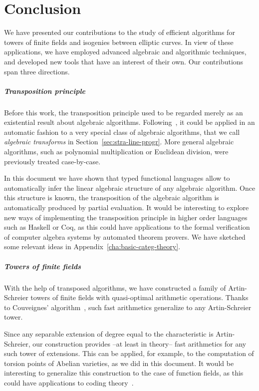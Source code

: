 \chapter{Conclusion}

We have presented our contributions to the study of efficient
algorithms for towers of finite fields and isogenies between elliptic
curves. In view of these applications, we have employed advanced
algebraic and algorithmic techniques, and developed new tools that
have an interest of their own. Our contributions span three directions.

\paragraph{Transposition principle}
Before this work, the transposition principle used to be regarded
merely as an existential result about algebraic algorithms.
Following~\cite{bostan+lecerf+schost:tellegen}, it could be applied in
an automatic fashion to a very special class of algebraic algorithms,
that we call \emph{algebraic transforms} in
Section~\ref{sec:stra-line-progr}. More general algebraic algorithms,
such as polynomial multiplication or Euclidean division, were
previously treated case-by-case.

In this document we have shown that typed functional languages allow
to automatically infer the linear algebraic structure of any algebraic
algorithm. Once this structure is known, the transposition of the
algebraic algorithm is automatically produced by partial evaluation.
It would be interesting to explore new ways of implementing the
transposition principle in higher order languages such as Haskell or
Coq, as this could have applications to the formal verification of
computer algebra systems by automated theorem provers.  We have
sketched some relevant ideas in Appendix~\ref{cha:basic-categ-theory}.

\paragraph{Towers of finite fields}
With the help of transposed algorithms, we have constructed a family
of Artin-Schreier towers of finite fields with quasi-optimal
arithmetic operations. Thanks to Couveignes'
algorithm~\cite{couveignes00}, such fast arithmetics generalize to any
Artin-Schreier tower.

Since any separable extension of degree equal to the characteristic is
Artin-Schreier, our construction provides --at least in theory-- fast
arithmetics for any such tower of extensions.  This can be applied,
for example, to the computation of torsion points of Abelian
varieties, as we did in this document. It would be interesting to
generalize this construction to the case of function fields, as this
could have applications to coding
theory~\cite{garcia+stichtenoth96,shum-et-al01}.

